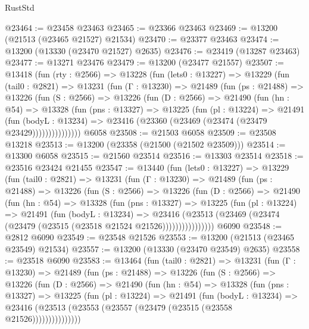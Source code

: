 \begin{lexlean}{RustStd}
\begin{coremodule}
@23464 := @23458 @23463
@23465 := @23366 @23463
@23469 := @13200 (@21513 (@23465 @21527) @21534)
@23470 := @23377 @23463
@23474 := @13200 (@13330 (@23470 @21527) @2635)
@23476 := @23419 (@13287 @23463)
@23477 := @13271 @23476
@23479 := @13200 (@23477 @21557)
@23507 := @13418
    (fun (rty : @2566) =>
    @13228
      (fun (lets0 : @13227) =>
      @13229
        (fun (tail0 : @2821) =>
        @13231
          (fun (Γ : @13230) =>
          @21489
            (fun (ps : @21488) =>
            @13226
              (fun (S : @2566) =>
              @13226
                (fun (D : @2566) =>
                @21490
                  (fun (hn : @54) =>
                  @13328
                    (fun (pns : @13327) =>
                    @13225
                      (fun (pl : @13224) =>
                      @21491
                        (fun (bodyL : @13234) =>
                        @23416 (@23360 (@23469 (@23474 (@23479 @23429)))))))))))))))
    @6058
@23508 := @21503 @6058
@23509 := @23508 @13218
@23513 := @13200 (@23358 (@21500 (@21502 @23509)))
@23514 := @13300 @6058
@23515 := @21560 @23514
@23516 := @13303 @23514
@23518 := @23516 @23424 @21455
@23547 := @13440
    (fun (lets0 : @13227) =>
    @13229
      (fun (tail0 : @2821) =>
      @13231
        (fun (Γ : @13230) =>
        @21489
          (fun (ps : @21488) =>
          @13226
            (fun (S : @2566) =>
            @13226
              (fun (D : @2566) =>
              @21490
                (fun (hn : @54) =>
                @13328
                  (fun (pns : @13327) =>
                  @13225
                    (fun (pl : @13224) =>
                    @21491
                      (fun (bodyL : @13234) =>
                      @23416
                        (@23513
                          (@23469 (@23474 (@23479 (@23515 (@23518 @21524 @21526))))))))))))))))
    @6090
@23548 := @2812 @6090
@23549 := @23548 @21526
@23553 := @13200 (@21513 (@23465 @23549) @21534)
@23557 := @13200 (@13330 (@23470 @23549) @2635)
@23558 := @23518 @6090
@23583 := @13464
    (fun (tail0 : @2821) =>
    @13231
      (fun (Γ : @13230) =>
      @21489
        (fun (ps : @21488) =>
        @13226
          (fun (S : @2566) =>
          @13226
            (fun (D : @2566) =>
            @21490
              (fun (hn : @54) =>
              @13328
                (fun (pns : @13327) =>
                @13225
                  (fun (pl : @13224) =>
                  @21491
                    (fun (bodyL : @13234) =>
                    @23416 (@23513 (@23553 (@23557 (@23479 (@23515 (@23558 @21526)))))))))))))))

\end{coremodule}
\end{lexlean}
